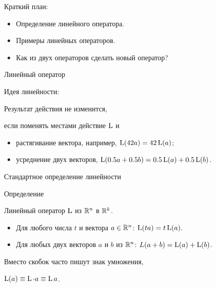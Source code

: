 

\begin{frame} %



\end{frame}


\begin{frame}{Краткий план:}

\begin{itemize}[<+->]
  \item Определение линейного оператора.
  \item Примеры линейных операторов.
  \item Как из двух операторов сделать новый оператор?
\end{itemize}

\end{frame}
    


\begin{frame}{Линейный оператор}


\alert{Идея линейности}:
  
Результат действия не изменится, 

если поменять местами действие $\operatorname{L}$ и

\begin{itemize}[<+->]
    \item растягивание вектора, например, $\operatorname{L}(42a)=42\operatorname{L}(a)$;
    \item усреднение двух векторов, $\operatorname{L}(0.5a+0.5b)=0.5\operatorname{L}(a) + 0.5\operatorname{L}(b)$.
  \end{itemize}


\end{frame}


\begin{frame}{Стандартное определение линейности}

\begin{block}{Определение}

\alert{Линейный оператор} $\operatorname{L}$ из $\mathbb{R}^n$ в $\mathbb{R}^k$.

\begin{itemize}[<+->]
  \item Для любого числа $t$ и вектора $a \in \mathbb{R}^n$: $\operatorname{L}(t a) = t\operatorname{L}(a)$.
  \item Для любых двух векторов $a$ и $b$ из $\mathbb{R}^n$: $L(a + b) = \operatorname{L}(a) + \operatorname{L}(b)$. 
\end{itemize}
\end{block}

\pause
\vspace{10pt}
Вместо скобок часто пишут знак умножения, 

$\operatorname{L}(a) \equiv \operatorname{L} \cdot a \equiv \operatorname{L} a$.



\end{frame}


